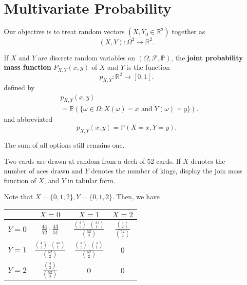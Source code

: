 
\section{Multivariate Probability}

Our objective is to treat random vectors \( (X,Y_{0} \in \mathbb{R}^{2} ) \) together as \[
	(X,Y) : \Omega ^{2} \to \mathbb{R}^{2} 
.\] 

\begin{definition}
	If \( X \) and \( Y \) are discrete random variables on \( (\Omega , \mathcal{F}, \mathbb{P}) \), the \textbf{joint probability mass function} \( P_{X,Y}(x,y) \) of \( X \) and \( Y \) is the function \[
		p_{X,Y} : \mathbb{R}^{2} \to [0, 1]
	.\] defined by 
	\begin{align*}
		&p_{X,Y}(x, y) \\ &= \mathbb{P}(\{\omega  \in \Omega : X(\omega ) = x \text{ and } Y(\omega )=y\}  )
	.\end{align*}
	and abbreviated \[
		p_{X,Y}(x, y) = \mathbb{P}(X=x, Y=y)
	.\] 
\end{definition}

\begin{note}
	The sum of all options still remains one.
\end{note}

\begin{eg}
	Two cards are drawn at random from a dech of 52 cards. If \( X \) denotes the number of aces drawn and \( Y \) denotes the number of kings, display the join mass function of \( X \), and \( Y \) in tabular form.
\end{eg}
\begin{explanation}
	Note that \( X = \{0,1,2\}, Y=\{0,1,2\}     \). Then, we have 
	\begin{center}
		\begin{tabular}{ |c| c c c| }
			\hline
			& \( X=0 \) & \( X=1 \) & \( X=2 \) \\
			\hline
			\( Y=0 \) & \( \frac{44}{52}\cdot \frac{43}{51} \) & \( \frac{\binom{4}{1} \cdot \binom{44}{1}}{\binom{52}{2}} \) & \( \frac{\binom{4}{2}}{\binom{52}{2}} \)\\ 
			\( Y=1 \) & \( \frac{\binom{4}{1} \cdot \binom{44}{1}}{\binom{52}{2}} \) & \( \frac{\binom{4}{1}\cdot \binom{4}{1}}{\binom{52}{2}} \) & 0 \\  
			\( Y=2 \) & \( \frac{\binom{4}{2}}{\binom{52}{2}} \) & 0 & 0 \\
			\hline
		\end{tabular}
	\end{center}
\end{explanation}

